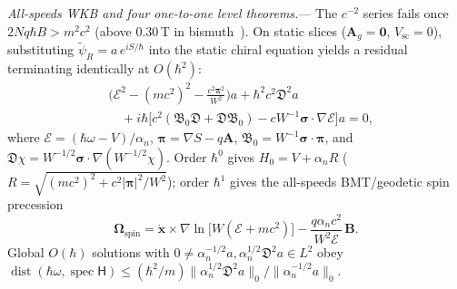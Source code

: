 \documentclass[aps,prl,reprint,superscriptaddress,nofootinbib,floatfix]{revtex4-2}
\theoremstyle{prlthm}
\newcommand{\prlsec}[1]{\par\smallskip\noindent\emph{#1.}---}
\begin{document}
\prlsec{All-speeds WKB and four one-to-one level theorems}
The $c^{-2}$ series fails once $2Nq\hbar B>m^2c^2$ (above $0.30$\,T in bismuth~\citep{Fuseya2015Transport}). On static slices ($\mathbf{A}_g=\mathbf{0}$, $V_\text{sc}=0$), substituting $\tilde{\psi}_R=a\,e^{iS/\hbar}$ into the static chiral equation yields a residual terminating identically at $O(\hbar^2)$:
\begin{equation}
  \begin{aligned}
  &\Big(\mathcal{E}^2-(mc^2)^2-\frac{c^2\boldsymbol{\pi}^2}{W^2}\Big)a+\hbar^2c^2\mathfrak{D}^2a\\
  &\quad+i\hbar\big[c^2(\mathfrak{B}_0\mathfrak{D}+\mathfrak{D}\mathfrak{B}_0)-cW^{-1}\boldsymbol{\sigma}\cdot\nabla\mathcal{E}\big]a=0,
  \end{aligned}
  \label{eq:wkb_residual}
\end{equation}
where $\mathcal{E}=(\hbar\omega-V)/\alpha_n$, $\boldsymbol{\pi}=\nabla S-q\mathbf{A}$, $\mathfrak{B}_0=W^{-1}\boldsymbol{\sigma}\cdot\boldsymbol{\pi}$, and $\mathfrak{D}\chi=W^{-1/2}\boldsymbol{\sigma}\cdot\nabla(W^{-1/2}\chi)$. Order $\hbar^0$ gives $H_0=V+\alpha_n R$ ($R=\sqrt{(mc^2)^2+c^2|\boldsymbol{\pi}|^2/W^2}$); order $\hbar^1$ gives the all-speeds BMT/geodetic spin precession~\citep{BolteKeppeler1999Semiclassical,SilenkoTeryaev2005Semiclassical}
\begin{equation}
  \boldsymbol{\Omega}_\text{spin}=\dot{\mathbf{x}}\times\nabla\ln\big[W(\mathcal{E}+mc^2)\big]-\frac{q\alpha_n c^2}{W^2\mathcal{E}}\,\mathbf{B}.
  \label{eq:spin_rate_all}
\end{equation}
Global $O(\hbar)$ solutions with $0\neq\alpha_n^{-1/2}a,\alpha_n^{1/2}\mathfrak{D}^2a\in L^2$ obey $\operatorname{dist}(\hbar\omega,\operatorname{spec}\mathsf{H})\le(\hbar^2/m)\allowbreak\|\alpha_n^{1/2}\mathfrak{D}^2a\|_0/\|\alpha_n^{-1/2}a\|_0$.
\end{document}
